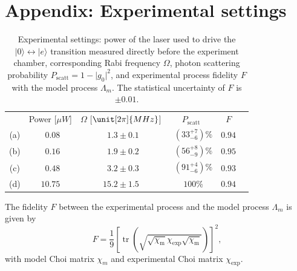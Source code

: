 \documentclass[12pt,
onecolumn,
superscriptaddress,
floatfix,
]{revtex4-2}
\DeclareMathOperator{\tr}{tr}
\newcommand{\N}{{\phantom{0}}}
\newcommand{\abs}[1]{{\lvert{#1}\rvert}}
\begin{document}
\section{Appendix: Experimental settings}
\begin{table}[h]                                                                                                                                                                                                                                                                                                                                                                                                                                                                                             
\centering
\begin{ruledtabular}
\begin{tabular}{cccccc}
 & Power [$\unit{\mu W}$] & $\Omega$ [$\unit[2\pi]{MHz}$]
 & $P_\mathrm{scatt}$ &  $F$ \\
\colrule
(a) & $\N0.08$ & $\N1.3 \pm 0.1$ & $\N\left(33^{+7}_{-6}\right)\%$ & $0.94$ \\
(b) & $\N0.16$ & $\N1.9 \pm 0.2$ & $\N\left(56^{+8}_{-9}\right)\%$ & $0.95$ \\
(c) & $\N0.48$ & $\N3.2 \pm 0.3$ & $\N\left(91^{+4}_{-6}\right)\%$ & $0.93$ \\
(d) & $ 10.75$ & $ 15.2 \pm 1.5$ & $ \N100\%$ & $0.94$ \\
\end{tabular}
\end{ruledtabular}
\caption{\label{tab:results}%
Experimental settings: power of the laser used to drive the $|0\rangle \leftrightarrow |e\rangle$ transition measured directly before the experiment chamber, corresponding Rabi 
 frequency $\Omega$, photon scattering probability $P_\mathrm{scatt}= 1-\abs{g_0}^2$,
 and experimental process fidelity $F$ 
 with the model process $\Lambda_m$.
The statistical uncertainty of $F$ is $\pm0.01$.}
\end{table}

The fidelity $F$ between the experimental process and the model process $\Lambda_m$ is given by
\begin{equation}
F= \frac19\left[\tr\left(\sqrt{ \sqrt{\chi_\mathrm{m}}
 \chi_\mathrm{exp} \sqrt{\chi_\mathrm{m}}}\right)\right]^2,
\label{eq:fidelity}
\end{equation}
with model Choi matrix $\chi_m$ and experimental Choi matrix $\chi_{\text{exp}}$.
\end{document}
